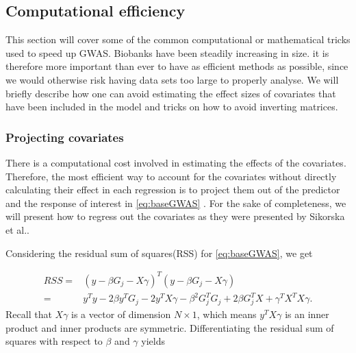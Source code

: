 \subsection{Computational efficiency} \label{sec:computationalEfficiency}
This section will cover some of the common computational or mathematical tricks used to speed up GWAS. Biobanks have been steadily increasing in size. it is therefore more important than ever to have as efficient methods as possible, since we would otherwise risk having data sets too large to properly analyse. We will briefly describe how one can avoid estimating the effect sizes of covariates that have been included in the model and tricks on how to avoid inverting matrices. 



\subsubsection{Projecting covariates}
There is a computational cost involved in estimating the effects of the covariates. Therefore, the most efficient way to account for the covariates without directly calculating their effect in each regression is to project them out of the predictor and the response of interest in \cref{eq:baseGWAS} \cite{sikorska2013gwas}. For the sake of completeness, we will present how to regress out the covariates as they were presented by Sikorska et al.\cite{sikorska2013gwas}. 

Considering the residual sum of squares(RSS) for \cref{eq:baseGWAS}, we get 

\begin{align}
	RSS =& \left( y - \beta G_j - X\gamma \right)^T\left( y - \beta G_j - X\gamma \right) \\
	=& y^T y - 2\beta y^T G_j - 2y^TX\gamma - \beta^2 G_j^TG_j + 2\beta G_j^T X + \gamma^T X^T X \gamma.
\end{align}
Recall that $ X\gamma $ is a vector of dimension $ N \times 1 $, which means $ y^T X \gamma $ is an inner product and inner products are symmetric. Differentiating the residual sum of squares with respect to $ \beta $ and $ \gamma $ yields

